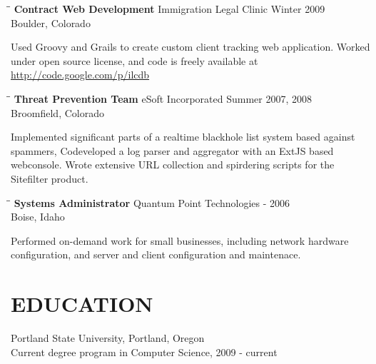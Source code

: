 \documentclass{res}
\begin{document}
\begin{resume}
  \begin{tabbing}
  \hspace{2.3in}\= \hspace{2.6in}\= \kill %
  {\bf Contract Web Development} \>Immigration Legal Clinic\> Winter 2009\\
			\>Boulder, Colorado
  \end{tabbing}\vspace{-20pt}
  Used Groovy and Grails to create custom client tracking web application. 
  Worked under open source license, and code is freely available at 
  \url{http://code.google.com/p/ilcdb}

  \vspace{-0.21in}	

  \begin{tabbing}%
  \hspace{2.3in}\= \hspace{2.6in}\= \kill %
  {\bf Threat Prevention Team}  \>eSoft Incorporated \> Summer 2007, 2008\\
			\>Broomfield, Colorado
  \end{tabbing}\vspace{-20pt}
  Implemented significant parts of a realtime blackhole list system based 
  against spammers, Codeveloped a log parser and aggregator with an ExtJS 
  based webconsole. Wrote extensive URL collection and spirdering 
  scripts for the Sitefilter product.

  \vspace{-0.21in}	

  \begin{tabbing}%
  \hspace{2.3in}\= \hspace{2.6in}\= \kill %
  {\bf Systems Administrator} \>Quantum Point Technologies - 2006\\
			\>Boise, Idaho
  \end{tabbing}\vspace{-20pt}
  Performed on-demand work for small businesses, including network hardware
  configuration, and server and client configuration and maintenace.

\vspace{-0.1in}	

\section{EDUCATION}          
  Portland State University, Portland, Oregon \\
  Current degree program in Computer Science, 2009 - current \\
  \vspace{-0.5in}	

\end{resume}
\end{document}
